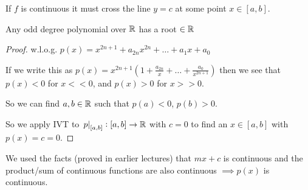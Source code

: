 \documentclass[twoside]{scrartcl}
\begin{document}
If $f$ is continuous it must cross the line $y=c$ at some point $x \in [a,b]$. 

\begin{corollary}
Any odd degree polynomial over $\mathbb{R}$ has a root $\in\mathbb{R}$	
\end{corollary}
\begin{proof}
w.l.o.g. $p(x) = x^{2n+1} + a_{2n}x^{2n} + \dots + a_1x + a_0$

If we write this as $p(x) = x^{2n+1}(1 + \frac{a_{2n}}{x} + \dots + \frac{a_0}{x^{2n+1}})$ then we see that $p(x) < 0$ for $x << 0$, and $p(x) > 0$ for $x>>0$. 

So we can find $a,b \in\mathbb{R}$ such that $p(a) < 0$,  $p(b) > 0$. 

So we apply IVT to $\left.p\right|_{[a,b]}: [a,b] \to \mathbb{R}$ with $c = 0$ to find an $x \in [a,b]$ with $p(x) = c = 0$.
\end{proof}

We used the facts (proved in earlier lectures) that $mx +c$ is continuous and the product/sum of continuous functions are also continuous $\implies p(x)$ is continuous. 
\end{document}
